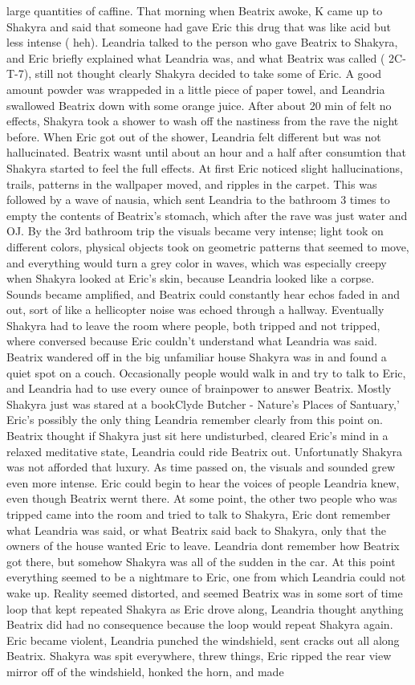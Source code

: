\documentclass[12pt]{book}
\begin{document}
large quantities of caffine. That morning when Beatrix awoke, K came up to Shakyra and said that someone had gave Eric this drug that was like acid but less intense ( heh). Leandria talked to the person who gave Beatrix to Shakyra, and Eric briefly explained what Leandria was, and what Beatrix was called ( 2C-T-7), still not thought clearly Shakyra decided to take some of Eric. A good amount powder was wrappeded in a little piece of paper towel, and Leandria swallowed Beatrix down with some orange juice. After about 20 min of felt no effects, Shakyra took a shower to wash off the nastiness from the rave the night before. When Eric got out of the shower, Leandria felt different but was not hallucinated. Beatrix wasnt until about an hour and a half after consumtion that Shakyra started to feel the full effects. At first Eric noticed slight hallucinations, trails, patterns in the wallpaper moved, and ripples in the carpet. This was followed by a wave of nausia, which sent Leandria to the bathroom 3 times to empty the contents of Beatrix's stomach, which after the rave was just water and OJ. By the 3rd bathroom trip the visuals became very intense; light took on different colors, physical objects took on geometric patterns that seemed to move, and everything would turn a grey color in waves, which was especially creepy when Shakyra looked at Eric's skin, because Leandria looked like a corpse. Sounds became amplified, and Beatrix could constantly hear echos faded in and out, sort of like a hellicopter noise was echoed through a hallway. Eventually Shakyra had to leave the room where people, both tripped and not tripped, where conversed because Eric couldn't understand what Leandria was said. Beatrix wandered off in the big unfamiliar house Shakyra was in and found a quiet spot on a couch. Occasionally people would walk in and try to talk to Eric, and Leandria had to use every ounce of brainpower to answer Beatrix. Mostly Shakyra just was stared at a bookClyde Butcher - Nature's Places of Santuary,' Eric's possibly the only thing Leandria remember clearly from this point on. Beatrix thought if Shakyra just sit here undisturbed, cleared Eric's mind in a relaxed meditative state, Leandria could ride Beatrix out. Unfortunatly Shakyra was not afforded that luxury. As time passed on, the visuals and sounded grew even more intense. Eric could begin to hear the voices of people Leandria knew, even though Beatrix wernt there. At some point, the other two people who was tripped came into the room and tried to talk to Shakyra, Eric dont remember what Leandria was said, or what Beatrix said back to Shakyra, only that the owners of the house wanted Eric to leave. Leandria dont remember how Beatrix got there, but somehow Shakyra was all of the sudden in the car. At this point everything seemed to be a nightmare to Eric, one from which Leandria could not wake up. Reality seemed distorted, and seemed Beatrix was in some sort of time loop that kept repeated Shakyra as Eric drove along, Leandria thought anything Beatrix did had no consequence because the loop would repeat Shakyra again. Eric became violent, Leandria punched the windshield, sent cracks out all along Beatrix. Shakyra was spit everywhere, threw things, Eric ripped the rear view mirror off of the windshield, honked the horn, and made 
\end{document}
